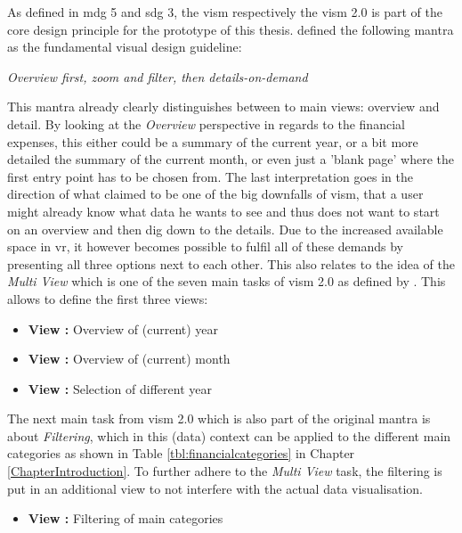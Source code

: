 As defined in \gls{mdg} 5 and \gls{sdg} 3, the \gls{vism} respectively the \gls{vism} 2.0 is part of the core design principle for the prototype of this thesis. \cite{Shneiderman1996} defined the following mantra as the fundamental visual design guideline:
\begin{framed}
	\textit{Overview first, zoom and filter, then details-on-demand}
\end{framed}
This mantra already clearly distinguishes between to main views: overview and detail. By looking at the \textit{Overview} perspective in regards to the financial expenses, this either could be a summary of the current year, or a bit more detailed the summary of the current month, or even just a 'blank page' where the first entry point has to be chosen from. The last interpretation goes in the direction of what \cite{Neil2006} claimed to be one of the big downfalls of \gls{vism}, that a user might already know what data he wants to see and thus does not want to start on an overview and then dig down to the details. Due to the increased available space in \gls{vr}, it however becomes possible to fulfil all of these demands by presenting all three options next to each other. This also relates to the idea of the \textit{Multi View} which is one of the seven main tasks of \gls{vism} 2.0 as defined by \cite{Stauffer2016}. This allows to define the first three views:
\begin{itemize}[noitemsep,nolistsep]
	\item \textbf{View :} Overview of (current) year
	\item \textbf{View :} Overview of (current) month
	\item \textbf{View :} Selection of different year
\end{itemize}
The next main task from \gls{vism} 2.0 which is also part of the original mantra is about \textit{Filtering}, which in this (data) context can be applied to the different main categories as shown in Table \ref{tbl:financialcategories} in Chapter \ref{ChapterIntroduction}. To further adhere to the \textit{Multi View} task, the filtering is put in an additional view to not interfere with the actual data visualisation.
\begin{itemize}[noitemsep,nolistsep]
	\item \textbf{View :} Filtering of main categories
\end{itemize}

